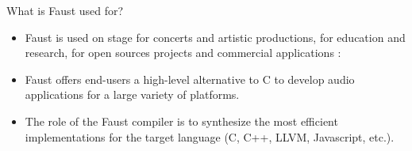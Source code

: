 
\begin{frame}[fragile]{What is Faust used for?}
	\begin{itemize}
		
		\item Faust is used on stage for concerts and artistic productions, for education and research, for open sources projects and commercial applications :
		
		\item Faust offers end-users a high-level alternative to C to develop audio applications for a large variety of platforms.
		
		\item The role of the Faust compiler is to synthesize the most efficient implementations for the target language (C, C++, LLVM, Javascript, etc.).
	\end{itemize}
	
\end{frame}
